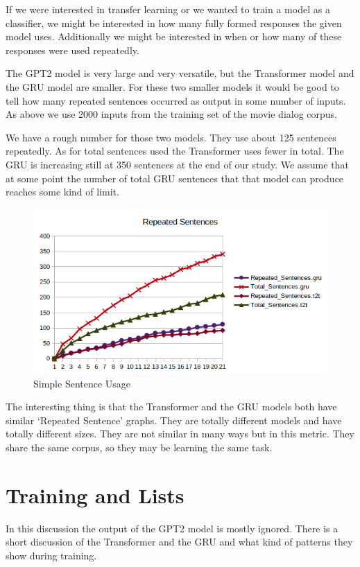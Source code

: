 If we were interested in transfer learning or we wanted to train a model as a classifier, we might be interested in how many fully formed responses the given model uses. Additionally we might be interested in when or how many of these responses were used repeatedly.

The GPT2 model is very large and very versatile, but the Transformer model and the GRU model are smaller. For these two smaller models it would be good to tell how many repeated sentences occurred as output in some number of inputs. As above we use 2000 inputs from the training set of the movie dialog corpus.

We have a rough number for those two models. They use about 125 sentences repeatedly. As for total sentences used the Transformer uses fewer in total. The GRU is increasing still at 350 sentences at the end of our study. We assume that at some point the number of total GRU sentences that that model can produce reaches some kind of limit.

\begin{figure}[H]
	\begin{center}
		\includegraphics[scale=0.75]{Figure_8}
		
		
	\end{center}
	\caption[Simple Sentence Usage]{Simple Sentence Usage}
	
	
\end{figure}


The interesting thing is that the Transformer and the GRU models both have similar `Repeated Sentence' graphs. They are totally different models and have totally different sizes. They are not similar in many ways but in this metric. They share the same corpus, so they may be learning the same task.

\section{Training and Lists}
In this discussion the output of the GPT2 model is mostly ignored. There is a short discussion of the Transformer and the GRU and what kind of patterns they show during training.


